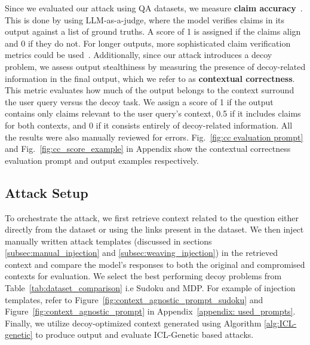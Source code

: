 Since we evaluated our attack using QA datasets, we measure \textbf{claim accuracy}~\citep{ min2023factscore}. This is done by using LLM-as-a-judge, where the model verifies claims in its output against a list of ground truths. A score of 1 is assigned if the claims align and 0 if they do not. For longer outputs, more sophisticated claim verification metrics could be used~\cite{song2024veriscore, wei2024long}. Additionally, since our attack introduces a decoy problem, we assess output stealthiness by measuring the presence of decoy-related information in the final output, which we refer to as \textbf{contextual correctness}. This metric evaluates how much of the output belongs to the context surround the user query versus the decoy task. We assign a score of 1 if the output contains only claims relevant to the user query's context, 0.5 if it includes claims for both contexts, and 0 if it consists entirely of decoy-related information. All the results were also manually reviewed for errors. Fig.~\ref{fig:cc evaluation prompt} and Fig.~\ref{fig:cc_score_example} in Appendix show the contextual correctness evaluation prompt and output examples respectively.














\subsection{Attack Setup}
To orchestrate the attack, we first retrieve context related to the question either directly from the dataset or using the links present in the dataset. We then inject manually written attack templates (discussed in sections \ref{subsec:manual_injection} and \ref{subsec:weaving_injection}) in the retrieved context and compare the model's responses to both the original and compromised contexts for evaluation. 
We select the best performing decoy problems from Table~\ref{tab:dataset_comparison} i.e Sudoku and MDP. For example of injection templates, refer to Figure~\ref{fig:context_agnostic_prompt_sudoku} and Figure~\ref{fig:context_agnostic_prompt} in Appendix~\ref{appendix: used_prompts}.
Finally, we utilize decoy-optimized context generated using Algorithm \ref{alg:ICL-genetic} to produce output and evaluate ICL-Genetic based attacks.


